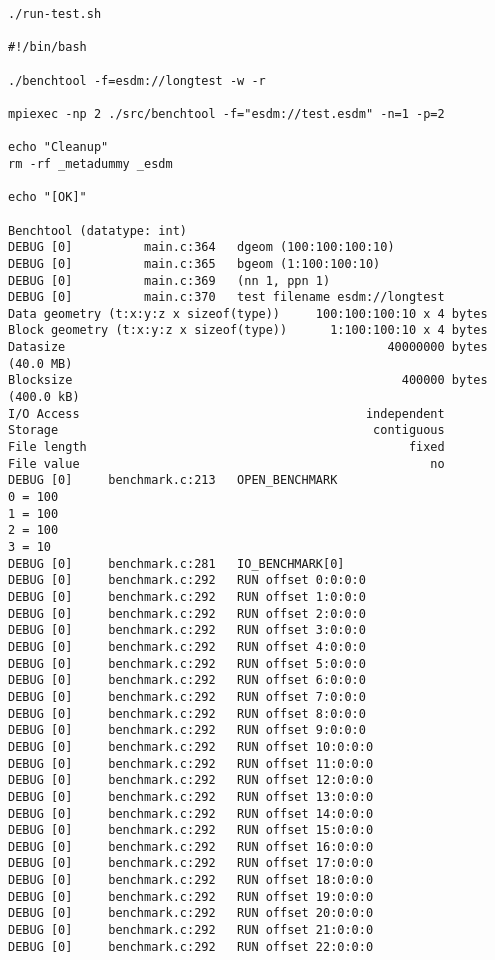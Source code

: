 \begin{verbatim}
./run-test.sh

#!/bin/bash

./benchtool -f=esdm://longtest -w -r

mpiexec -np 2 ./src/benchtool -f="esdm://test.esdm" -n=1 -p=2

echo "Cleanup"
rm -rf _metadummy _esdm

echo "[OK]"

Benchtool (datatype: int)
DEBUG [0]          main.c:364   dgeom (100:100:100:10)
DEBUG [0]          main.c:365   bgeom (1:100:100:10)
DEBUG [0]          main.c:369   (nn 1, ppn 1)
DEBUG [0]          main.c:370   test filename esdm://longtest
Data geometry (t:x:y:z x sizeof(type))     100:100:100:10 x 4 bytes
Block geometry (t:x:y:z x sizeof(type))      1:100:100:10 x 4 bytes
Datasize                                             40000000 bytes                (40.0 MB)
Blocksize                                              400000 bytes                (400.0 kB)
I/O Access                                        independent
Storage                                            contiguous
File length                                             fixed
File value                                                 no
DEBUG [0]     benchmark.c:213   OPEN_BENCHMARK
0 = 100
1 = 100
2 = 100
3 = 10
DEBUG [0]     benchmark.c:281   IO_BENCHMARK[0]
DEBUG [0]     benchmark.c:292   RUN offset 0:0:0:0
DEBUG [0]     benchmark.c:292   RUN offset 1:0:0:0
DEBUG [0]     benchmark.c:292   RUN offset 2:0:0:0
DEBUG [0]     benchmark.c:292   RUN offset 3:0:0:0
DEBUG [0]     benchmark.c:292   RUN offset 4:0:0:0
DEBUG [0]     benchmark.c:292   RUN offset 5:0:0:0
DEBUG [0]     benchmark.c:292   RUN offset 6:0:0:0
DEBUG [0]     benchmark.c:292   RUN offset 7:0:0:0
DEBUG [0]     benchmark.c:292   RUN offset 8:0:0:0
DEBUG [0]     benchmark.c:292   RUN offset 9:0:0:0
DEBUG [0]     benchmark.c:292   RUN offset 10:0:0:0
DEBUG [0]     benchmark.c:292   RUN offset 11:0:0:0
DEBUG [0]     benchmark.c:292   RUN offset 12:0:0:0
DEBUG [0]     benchmark.c:292   RUN offset 13:0:0:0
DEBUG [0]     benchmark.c:292   RUN offset 14:0:0:0
DEBUG [0]     benchmark.c:292   RUN offset 15:0:0:0
DEBUG [0]     benchmark.c:292   RUN offset 16:0:0:0
DEBUG [0]     benchmark.c:292   RUN offset 17:0:0:0
DEBUG [0]     benchmark.c:292   RUN offset 18:0:0:0
DEBUG [0]     benchmark.c:292   RUN offset 19:0:0:0
DEBUG [0]     benchmark.c:292   RUN offset 20:0:0:0
DEBUG [0]     benchmark.c:292   RUN offset 21:0:0:0
DEBUG [0]     benchmark.c:292   RUN offset 22:0:0:0

\end{verbatim}
